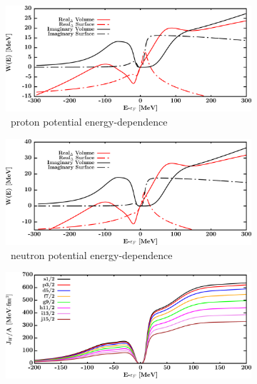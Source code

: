 \begin{figure}[hbtp]
\begin{subfigure}[b]{0.45\textwidth}
        \centering
        \includegraphics[width=\linewidth]{figures/ni58_protonPotentials.png}
        \caption{\niEight\ proton potential energy-dependence}
        \label{DOMFitData_ni58_proton_potentialComponent_energy}
    \end{subfigure}\hspace{6pt}
    \begin{subfigure}[b]{0.45\linewidth}
        \centering
        \includegraphics[width=\linewidth]{figures/ni58_neutronPotentials.png}
        \caption{\niEight\ neutron potential energy-dependence}
        \label{DOMFitData_ni58_neutron_potentialComponent_energy}
    \end{subfigure}\vspace{0.3in}
    \begin{subfigure}[b]{0.45\textwidth}
        \centering
        \includegraphics[width=\linewidth]{figures/ni58_protonVolumeIntegrals.png}

\end{subfigure}
\end{figure}
